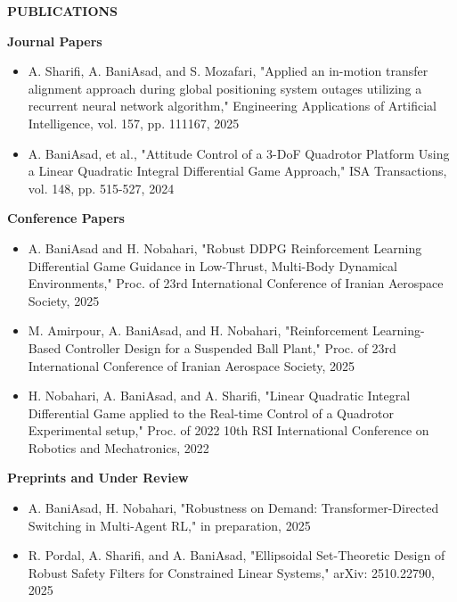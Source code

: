 \documentclass[12pt]{article}
\begin{document}
\vspace{8pt}

\begin{center}
	{\noindent \bfseries PUBLICATIONS}
\end{center}

\vspace{-4pt}

\noindent
\textbf{Journal Papers}

\begin{itemize} \itemsep -1pt
	\item A. Sharifi, A. BaniAsad, and S. Mozafari, "Applied an in-motion transfer alignment approach during global positioning system outages utilizing a recurrent neural network algorithm," Engineering Applications of Artificial Intelligence, vol. 157, pp. 111167, 2025
	\item A. BaniAsad, et al., "Attitude Control of a 3-DoF Quadrotor Platform Using a Linear Quadratic Integral Differential Game Approach," ISA Transactions, vol. 148, pp. 515-527, 2024
\end{itemize}

\vspace{4pt}

\noindent
\textbf{Conference Papers}

\begin{itemize} \itemsep -1pt
	\item A. BaniAsad and H. Nobahari, "Robust DDPG Reinforcement Learning Differential Game Guidance in Low-Thrust, Multi-Body Dynamical Environments," Proc. of 23rd International Conference of Iranian Aerospace Society, 2025
	\item M. Amirpour, A. BaniAsad, and H. Nobahari, "Reinforcement Learning-Based Controller Design for a Suspended Ball Plant," Proc. of 23rd International Conference of Iranian Aerospace Society, 2025
	\item H. Nobahari, A. BaniAsad, and A. Sharifi, "Linear Quadratic Integral Differential Game applied to the Real-time Control of a Quadrotor Experimental setup," Proc. of 2022 10th RSI International Conference on Robotics and Mechatronics, 2022
\end{itemize}

\vspace{4pt}

\noindent
\textbf{Preprints and Under Review}

\begin{itemize} \itemsep -1pt
	\item A. BaniAsad, H. Nobahari, "Robustness on Demand: Transformer-Directed Switching in Multi-Agent RL," in preparation, 2025
	\item R. Pordal, A. Sharifi, and A. BaniAsad, "Ellipsoidal Set-Theoretic Design of Robust Safety Filters for Constrained Linear Systems," arXiv: 2510.22790, 2025
\end{itemize}
\end{document}
